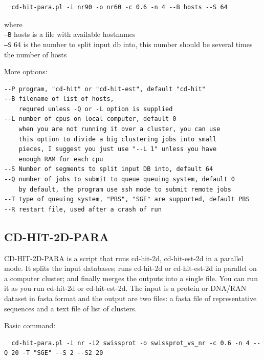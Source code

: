 \documentclass[12pt,a4paper]{article}
\begin{document}
\begin{lstlisting}
  cd-hit-para.pl -i nr90 -o nr60 -c 0.6 -n 4 --B hosts --S 64
\end{lstlisting}

  
where\\
\texttt{--B} hosts is a file with available hostnames\\
\texttt{--S} 64 is the number to split input db into, this number should be several times the number of hosts 

More options:
\begin{lstlisting}
--P program, "cd-hit" or "cd-hit-est", default "cd-hit"
--B filename of list of hosts,
    requred unless -Q or -L option is supplied
--L number of cpus on local computer, default 0
    when you are not running it over a cluster, you can use
    this option to divide a big clustering jobs into small
    pieces, I suggest you just use "--L 1" unless you have
    enough RAM for each cpu
--S Number of segments to split input DB into, default 64
--Q number of jobs to submit to queue queuing system, default 0
    by default, the program use ssh mode to submit remote jobs
--T type of queuing system, "PBS", "SGE" are supported, default PBS
--R restart file, used after a crash of run
\end{lstlisting}

\subsection{CD-HIT-2D-PARA }

CD-HIT-2D-PARA is a script that runs cd-hit-2d, cd-hit-est-2d in a parallel
mode. It splits the input databases; runs cd-hit-2d or cd-hit-est-2d in
parallel on a computer cluster; and finally merges the outputs into a single
file.  You can run it as you run cd-hit-2d or cd-hit-est-2d. The input is a
protein or DNA/RAN dataset in fasta format and the output are two files: a
fasta file of representative sequences and a text file of list of clusters. 

Basic command:

\begin{lstlisting}
  cd-hit-para.pl -i nr -i2 swissprot -o swissprot_vs_nr -c 0.6 -n 4 --Q 20 -T "SGE" --S 2 --S2 20
\end{lstlisting}
\end{document}
